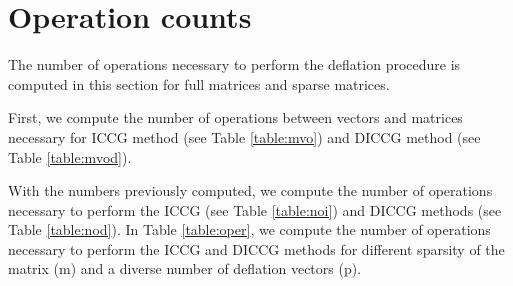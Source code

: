 \documentclass[12pt]{article}
\begin{document}
{\newpage
\section{Operation counts}\label{a5}
\hspace{0.5cm}The number of operations necessary to perform the deflation procedure is computed in this section 
for full matrices and sparse matrices.\par
First, we compute the number of operations between vectors and matrices necessary for ICCG method 
(see Table \ref{table:mvo}) and DICCG method (see Table \ref{table:mvod}). \par
With the numbers previously computed, we compute the number of operations necessary to perform the ICCG 
(see Table \ref{table:noi}) and DICCG methods (see Table \ref{table:nod}).  
In Table \ref{table:oper}, we compute the number of operations necessary to perform the ICCG and DICCG 
methods for different sparsity of the matrix (m) and a diverse number of deflation vectors (p).\par

 \renewcommand{\arraystretch}{1.3}
 
}
\end{document}
